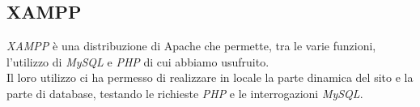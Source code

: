\subsection{XAMPP}
\emph{XAMPP} è una distribuzione di Apache che permette, tra le varie funzioni, l'utilizzo di \emph{MySQL} e \emph{PHP} di cui abbiamo usufruito.\\
Il loro utilizzo ci ha permesso di realizzare in locale la parte dinamica del sito e la parte di database, testando le richieste \emph{PHP} e le interrogazioni \emph{MySQL}.